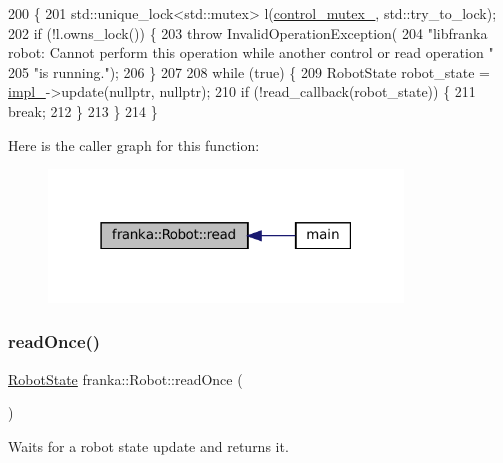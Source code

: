 \begin{DoxyCode}
200                                                                    \{
201   std::unique\_lock<std::mutex> l(\hyperlink{classfranka_1_1Robot_a719ad1fab76f8edfc9f6f761671c1375}{control\_mutex\_}, std::try\_to\_lock);
202   \textcolor{keywordflow}{if} (!l.owns\_lock()) \{
203     \textcolor{keywordflow}{throw} InvalidOperationException(
204         \textcolor{stringliteral}{"libfranka robot: Cannot perform this operation while another control or read operation "}
205         \textcolor{stringliteral}{"is running."});
206   \}
207 
208   \textcolor{keywordflow}{while} (\textcolor{keyword}{true}) \{
209     RobotState robot\_state = \hyperlink{classfranka_1_1Robot_aca155054184e5b6478942fd6a1b82ba4}{impl\_}->update(\textcolor{keyword}{nullptr}, \textcolor{keyword}{nullptr});
210     \textcolor{keywordflow}{if} (!read\_callback(robot\_state)) \{
211       \textcolor{keywordflow}{break};
212     \}
213   \}
214 \}
\end{DoxyCode}
Here is the caller graph for this function\+:
\nopagebreak
\begin{figure}[H]
\begin{center}
\leavevmode
\includegraphics[width=267pt]{classfranka_1_1Robot_a82f85eed20426901a7e77b66c041664b_icgraph}
\end{center}
\end{figure}
\mbox{\label{classfranka_1_1Robot_a7ea7074a07b63fcf6933e97b078c7168}} 
\subsubsection{\texorpdfstring{read\+Once()}{readOnce()}}
{\footnotesize\ttfamily \hyperlink{structfranka_1_1RobotState}{Robot\+State} franka\+::\+Robot\+::read\+Once (\begin{DoxyParamCaption}{ }\end{DoxyParamCaption})}

Waits for a robot state update and returns it.


